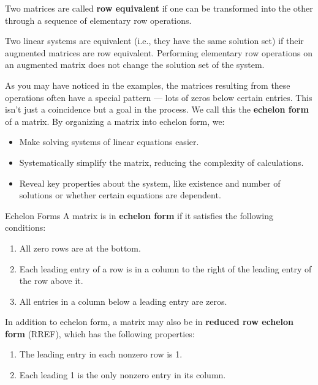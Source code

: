 Two matrices are called \textbf{row equivalent} if one can be transformed into the other through a sequence of elementary row operations.

\begin{remark}
Two linear systems are equivalent (i.e., they have the same solution set) if their augmented matrices are row equivalent. Performing elementary row operations on an augmented matrix does not change the solution set of the system. \end{remark}

As you may have noticed in the examples, the matrices resulting from these operations often have a special pattern — lots of zeros below certain entries. This isn't just a coincidence but a goal in the process. We call this the \textbf{echelon form} of a matrix. By organizing a matrix into echelon form, we:

\begin{itemize}
    \item Make solving systems of linear equations easier.
    \item Systematically simplify the matrix, reducing the complexity of calculations.
    \item Reveal key properties about the system, like existence and number of solutions or whether certain equations are dependent.
\end{itemize}

\begin{definition}{Echelon Forms}
A matrix is in \textbf{echelon form} if it satisfies the following conditions:
\begin{enumerate}
    \item All zero rows are at the bottom.
    \item Each leading entry of a row is in a column to the right of the leading entry of the row above it.
    \item All entries in a column below a leading entry are zeros.
\end{enumerate}

In addition to echelon form, a matrix may also be in \textbf{reduced row echelon form} (RREF), which has the following properties:
\begin{enumerate}[resume]
    \item The leading entry in each nonzero row is 1.
    \item Each leading 1 is the only nonzero entry in its column.
\end{enumerate}
\end{definition}


